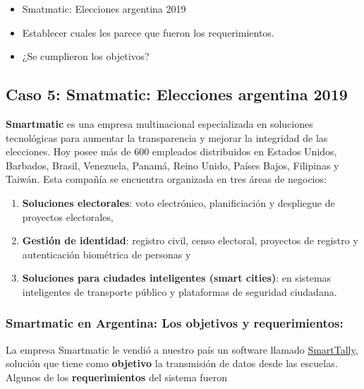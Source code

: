 \documentclass[titlepage,a4paper,twoside]{article}
\theoremstyle{definition}
\numberwithin{algorithm}{section}
\theoremstyle{remark}
\numberwithin{equation}{section}
\begin{document}
    \begin{itemize}
    	\item Smatmatic: Elecciones argentina 2019
    	\item Establecer cuales les parece que fueron los requerimientos.
    	\item ¿Se cumplieron los objetivos?
    \end{itemize}

    \subsection{Caso 5: Smatmatic: Elecciones argentina 2019}
    
    
    \textbf{Smartmatic} es una empresa multinacional especializada en soluciones tecnológicas para aumentar la transparencia y mejorar la integridad de las elecciones. Hoy posee más de $600$ empleados distribuidos en Estados Unidos, Barbados, Brasil, Venezuela, Panamá, Reino Unido, Países Bajos, Filipinas y Taiwán. Esta compañía se encuentra organizada en tres áreas de negocios: 
    \begin{enumerate}
    	\item \textbf{Soluciones electorales}: voto electrónico, planificiación y despliegue de proyectos electorales,
    	\item \textbf{Gestión de identidad}: registro civil, censo electoral, proyectos de registro y autenticación biométrica de personas y
    	\item \textbf{Soluciones para ciudades inteligentes (smart cities)}: en sistemas inteligentes de transporte público y plataformas de seguridad ciudadana.
    \end{enumerate}
    
    
    \subsubsection{Smartmatic en Argentina: Los objetivos y requerimientos:}
    
    La empresa Smartmatic le vendió a nuestro país un software llamado \href{https://www.smartmatic.com/es/elecciones/elecciones-manuales/smarttally/}{SmartTally}, solución que tiene como \textbf{objetivo} la transmisión de datos desde las escuelas. Algunos de los \textbf{requerimientos} del sistema fueron
    
\end{document}
